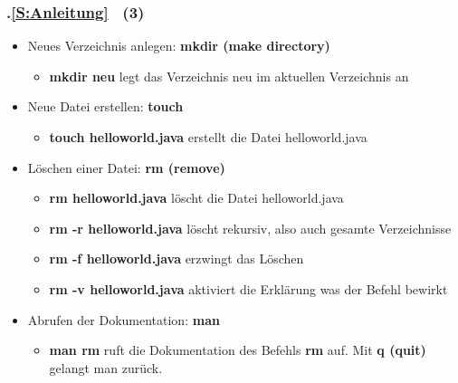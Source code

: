 \begin{frame}[t]%
\frametitle{\kap.\ref{S:Anleitung} \stitle\ (3)}%

\begin{itemize}
  \setlength{\itemsep}{4pt}
  \item Neues Verzeichnis anlegen: \textbf{mkdir (make directory)}
  \begin{itemize}
    \item \textbf{mkdir neu} legt das Verzeichnis neu im aktuellen Verzeichnis an
  \end{itemize}
  \item Neue Datei erstellen: \textbf{touch}
  \begin{itemize}
    \item \textbf{touch helloworld.java} erstellt die Datei helloworld.java
  \end{itemize}
  \item Löschen einer Datei: \textbf{rm (remove)}
  \begin{itemize}
    \setlength{\itemsep}{2pt}
    \item \textbf{rm helloworld.java} löscht die Datei helloworld.java
    \item \textbf{rm -r helloworld.java} löscht rekursiv, also auch gesamte Verzeichnisse
    \item \textbf{rm -f helloworld.java} erzwingt das Löschen
    \item \textbf{rm -v helloworld.java} aktiviert die Erklärung was der Befehl bewirkt
  \end{itemize}
  \item Abrufen der Dokumentation: \textbf{man}
  \begin{itemize}
    \item \textbf{man rm} ruft die Dokumentation des Befehls \textbf{rm} auf. Mit \textbf{q (quit)} gelangt man zurück.
  \end{itemize}
\end{itemize}
\end{frame}


